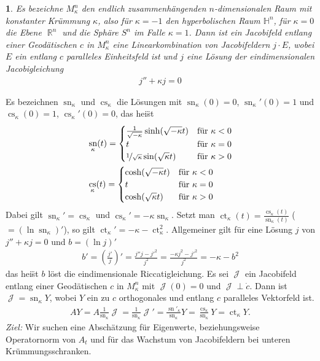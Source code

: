\documentclass[paper=A4, twoside, chapterprefix=true, bibliography=totoc, headsepline]{scrbook}
\DeclareMathOperator{\R}{\mathbb{R}}
\renewcommand{\H}{\ensuremath{\mathbb{H}}}
\DeclareMathOperator{\calJ}{\mathcal{J}}
\DeclareMathOperator{\cs}{cs}       %
\DeclareMathOperator{\ct}{ct}       %
\DeclareMathOperator{\sn}{sn}       %
\theoremstyle{plain}
\theoremstyle{nonumberplain}
\theoremstyle{empty}
\newtheorem{emptythm}{}%
\theoremstyle{break}
\begin{document}
\begin{emptythm}
  Es bezeichne $M_\kappa^n$ den endlich zusammenh\"angenden $n$-dimensionalen Raum  mit konstanter Kr\"ummung $\kappa$, also f\"ur $\kappa = -1$ den hyperbolischen Raum $\H^n$, f\"ur $\kappa = 0$ die Ebene $\R^n$ und die Sph\"are $S^n$ im Falle $\kappa = 1$.
  Dann ist ein Jacobifeld entlang einer Geod\"atischen $c$ in $M_\kappa^n$ eine Linearkombination von Jacobifeldern $j \cdot E$, wobei $E$ ein entlang $c$ paralleles Einheitsfeld ist und $j$ eine L\"osung der eindimensionalen Jacobigleichung
  \begin{align*}
    j'' + \kappa j = 0
  \end{align*}\end{emptythm}

Es bezeichnen $\sn_\kappa$ und $\cs_\kappa$ die L\"osungen mit $\sn_\kappa(0) = 0$, $\sn_\kappa'(0) = 1$ und $\cs_\kappa(0) = 1$, $\cs_\kappa'(0) = 0$, das hei\"st
\begin{align*}
  &\sn_\kappa(t) = \begin{cases}
    \frac{1}{\sqrt{-\kappa}} \sinh(\sqrt{-\kappa}t) & \text{f\"ur } \kappa < 0\\
    t & \text{f\"ur } \kappa = 0\\
    \nicefrac{1}{\sqrt{\kappa}} \sin(\sqrt{\kappa}t) & \text{f\"ur } \kappa > 0\\
  \end{cases}\\
  &\cs_\kappa(t) = \begin{cases}
    \cosh(\sqrt{-\kappa}t) & \text{f\"ur } \kappa < 0\\
    t & \text{f\"ur } \kappa = 0\\
    \cosh(\sqrt{\kappa}t) & \text{f\"ur } \kappa > 0\\
  \end{cases}
\end{align*}
Dabei gilt $\sn_\kappa' = \cs_\kappa$ und $\cs_\kappa' = -\kappa \sn_\kappa$. Setzt man $\ct_\kappa(t) = \frac{\cs_\kappa(t)}{\sn_\kappa(t)}$ ($= (\ln \sn_\kappa)'$), so gilt $\ct_\kappa' = -\kappa - \ct_\kappa^2$. Allgemeiner gilt f\"ur eine L\"osung $j$ von $j'' + \kappa j = 0$ und $b = (\ln j)'$
\begin{align*}
  b' = \left( \frac{j'}{j} \right)' = \frac{j''j - {j'}^2}{j^2} = \frac{-\kappa j^2 - {j'}^2}{j^2} = -\kappa - b^2
\end{align*}
das hei\"st $b$ l\"ost die eindimensionale Riccatigleichung.
Es sei $\calJ$ ein Jacobifeld entlang einer Geod\"atischen $c$ in $M^n_{\kappa}$ mit $\calJ(0) = 0$ und $\calJ \perp \dot c$.
Dann ist $\calJ = \sn_{\kappa}Y$, wobei $Y$ ein zu $c$ orthogonales und entlang $c$ paralleles Vektorfeld ist.
\begin{align*}
  AY = A \frac{1}{\sn_{\kappa}}\calJ
  = \frac{1}{\sn_{\kappa}}\calJ'
  = \frac{\sn'_{\kappa}}{\sn_{\kappa}}Y
  = \frac{\cs_{\kappa}}{\sn_{\kappa}}Y
  = \ct_{\kappa}Y.
\end{align*}
\emph{Ziel:} Wir suchen eine Absch\"atzung f\"ur Eigenwerte, beziehungsweise Operatornorm von $A_t$ und f\"ur das Wachstum von Jacobifeldern bei unteren Kr\"ummungsschranken.
\end{document}
